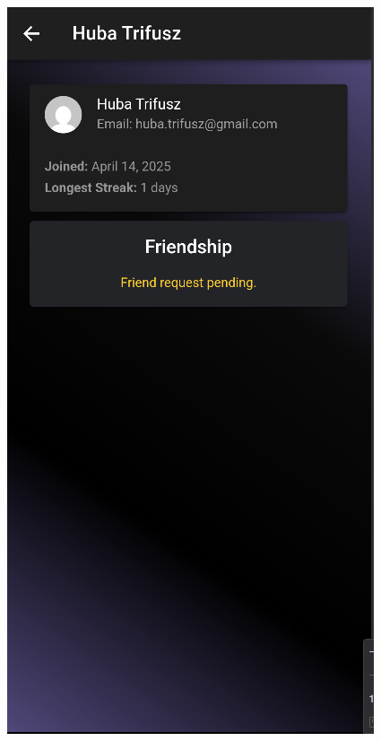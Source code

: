 \documentclass[12pt]{report}
\begin{document}
\begin{figure}[H]
\begin{minipage}[b]{0.25\textwidth}
    \end{minipage} %
    \begin{minipage}[b]{0.25\textwidth}
        \centering
        \includegraphics[width=\linewidth]{src/friends5.png}

    \end{minipage}

\end{figure}
\end{document}
